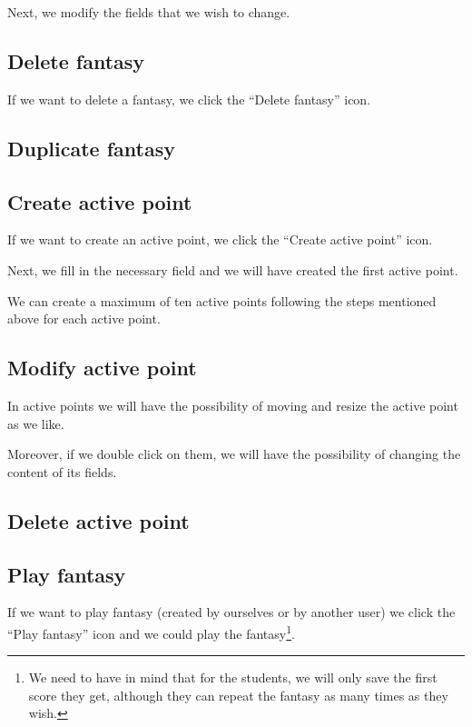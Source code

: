 \documentclass{book}
\begin{document}
Next, we modify the fields that we wish to change.



\subsection{Delete fantasy}
If we want to delete a fantasy, we click the ``Delete fantasy'' icon.


\subsection{Duplicate fantasy}


\subsection{Create active point}
If we want to create an active point, we click the ``Create active point'' icon.



Next, we fill in the necessary field and we will have created the first active point.


We can create a maximum of ten active points following the steps mentioned above for each active point.


\subsection{Modify active point}
In active points we will have the possibility of moving and resize the active point as we like.

Moreover, if we double click on them, we will have the possibility of changing the content of its fields.

\subsection{Delete active point}

\subsection{Play fantasy}
If we want to play fantasy (created by ourselves or by another user) we click the ``Play fantasy'' icon and we could play the fantasy\footnote{We need to have in mind that for the students, we will only save the first score they get, although they can repeat the fantasy as many times as they wish.}.



	
\end{document}
